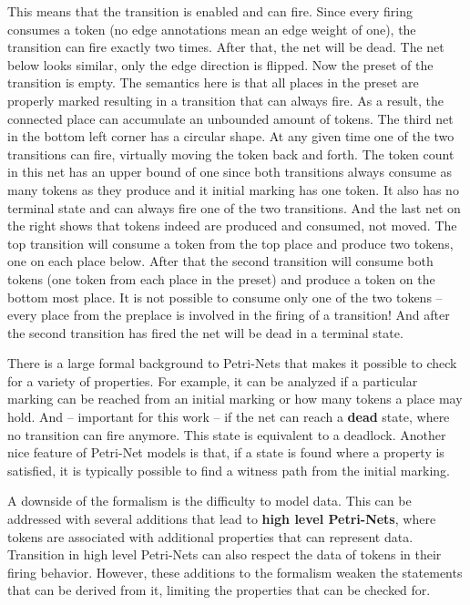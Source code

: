 This means that the transition is enabled and can fire.
Since every firing consumes a token (no edge annotations mean an edge weight of one), the transition can fire exactly two times.
After that, the net will be dead.
The net below looks similar, only the edge direction is flipped.
Now the preset of the transition is empty.
The semantics here is that all places in the preset are properly marked resulting in a transition that can always fire.
As a result, the connected place can accumulate an unbounded amount of tokens.
The third net in the bottom left corner has a circular shape.
At any given time one of the two transitions can fire, virtually moving the token back and forth.
The token count in this net has an upper bound of one since both transitions always consume as many tokens as they produce and it initial marking has one token.
It also has no terminal state and can always fire one of the two transitions.
And the last net on the right shows that tokens indeed are produced and consumed, not moved.
The top transition will consume a token from the top place and produce two tokens, one on each place below.
After that the second transition will consume both tokens (one token from each place in the preset) and produce a token on the bottom most place.
It is not possible to consume only one of the two tokens -- every place from the preplace is involved in the firing of a transition!
And after the second transition has fired the net will be dead in a terminal state.

There is a large formal background to Petri-Nets that makes it possible to check for a variety of properties\cite{murata1989petri}.
For example, it can be analyzed if a particular marking can be reached from an initial marking or how many tokens a place may hold.
And -- important for this work -- if the net can reach a \textbf{dead} state, where no transition can fire anymore.
This state is equivalent to a deadlock.
Another nice feature of Petri-Net models is that, if a state is found where a property is satisfied, it is typically possible to find a witness path from the initial marking.


A downside of the formalism is the difficulty to model data.
This can be addressed with several additions that lead to \textbf{high level Petri-Nets}, where tokens are associated with additional properties that can represent data.
Transition in high level Petri-Nets can also respect the data of tokens in their firing behavior.
However, these additions to the formalism weaken the statements that can be derived from it, limiting the properties that can be checked for.

